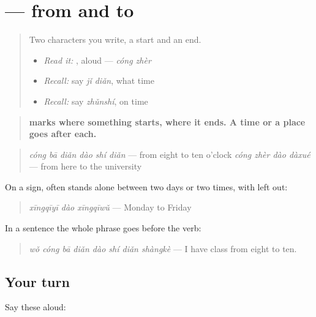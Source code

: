 \section[\texorpdfstring{\zh{从八点到十点} (cóng bā diǎn dào shí diǎn)}{从八点到十点 (cóng bā diǎn dào shí diǎn)}]{ — from and to}

\label{lesson:ZH-C155-cong-dao}



\begin{quote}
Two characters you write, a start and an end.

\begin{itemize}
\raggedright
  \item \emph{Read it:} , aloud — \emph{cóng zhèr}
  \item \emph{Recall:} say \emph{jǐ diǎn}, what time
  \item \emph{Recall:} say \emph{zhǔnshí}, on time
\end{itemize}
\end{quote}

\begin{grammarlens}[title={Grammar Lens: \zh{从} … \zh{到} …, a start and an end}]
\begin{quote}
\textbf{ marks where something starts,  where it ends. A time or a place goes after each.}
\end{quote}

\begin{quote}
\textbf{} \emph{cóng bā diǎn dào shí diǎn} — from eight to ten o'clock \textbf{} \emph{cóng zhèr dào dàxué} — from here to the university
\end{quote}

On a sign,  often stands alone between two days or two times, with  left out:

\begin{quote}
\textbf{} \emph{xīngqīyī dào xīngqīwǔ} — Monday to Friday
\end{quote}

In a sentence the whole phrase goes before the verb:

\begin{quote}
\textbf{} \emph{wǒ cóng bā diǎn dào shí diǎn shàngkè} — I have class from eight to ten.
\end{quote}
\end{grammarlens}

\subsection*{Your turn}
Say these aloud:

